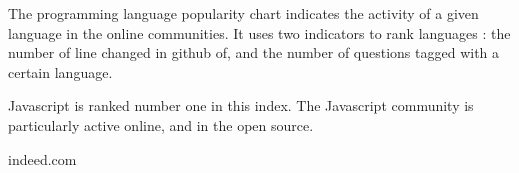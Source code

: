 The programming language popularity chart indicates the activity of a given language in the online communities.
It uses two indicators to rank languages : the number of line changed in github of, and the number of questions tagged with a certain language.

% 

Javascript is ranked number one in this index.
The Javascript community is particularly active online, and in the open source.






indeed.com
